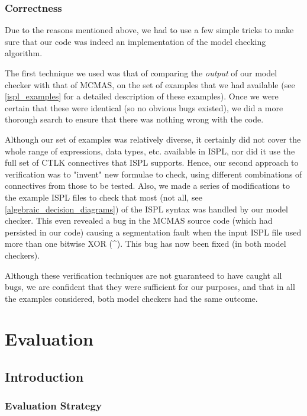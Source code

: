 \documentclass[11pt]{article}
\begin{document}
\subsubsection{Correctness}

 Due to the reasons mentioned above, we had to use a few simple tricks to make sure that our code was indeed an implementation of the model checking algorithm. 

The first technique we used was that of comparing the \textit{output} of our model checker with that of MCMAS, on the set of examples that we had available (see \ref{ispl_examples} for a detailed description of these examples). Once we were certain that these were identical (so no obvious bugs existed), we did a more thorough search to ensure that there was nothing wrong with the code. 

Although our set of examples was relatively diverse, it certainly did not cover the whole range of expressions, data types, etc. available in ISPL, nor did it use the full set of CTLK connectives that ISPL supports.
Hence, our second approach to verification was to "invent" new formulae to check, using different combinations of connectives from those to be tested. Also, we made a series of modifications to the example ISPL files to check that most (not all, see \ref{algebraic_decision_diagrams}) of the ISPL syntax was handled by our model checker. This even revealed a bug in the MCMAS source code (which had persisted in our code) causing a segmentation fault when the input ISPL file used more than one bitwise XOR (\^{}). This bug has now been fixed (in both model checkers).

Although these verification techniques are not guaranteed to have caught all bugs, we are confident that they were sufficient for our purposes, and that in all the examples considered, both model checkers had the same outcome.


\section{Evaluation} 

\subsection{Introduction}

\subsubsection{Evaluation Strategy}
\end{document}
